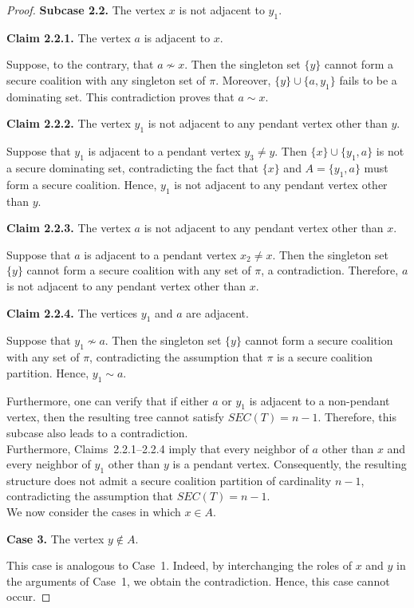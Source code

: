 \documentclass[12pt]{article}
\begin{document}
\begin{proof}
\textbf{Subcase 2.2.} The vertex $x$ is not adjacent to $y_1$.

\textbf{Claim 2.2.1.} The vertex $a$ is adjacent to $x$.

Suppose, to the contrary, that $a\not\sim x$. Then the singleton set $\{y\}$ cannot form a secure coalition with any singleton set of $\pi$. Moreover, $\{y\}\cup\{a,y_1\}$
fails to be a dominating set. This contradiction proves that $a\sim x$.

\textbf{Claim 2.2.2.} The vertex $y_1$ is not adjacent to any pendant vertex other than $y$.

Suppose that $y_1$ is adjacent to a pendant vertex $y_3\neq y$. Then $\{x\}\cup\{y_1,a\}$
is not a secure dominating set, contradicting the fact that $\{x\}$ and $A=\{y_1,a\}$ must form a secure coalition. Hence, $y_1$ is not adjacent to any pendant vertex other than $y$.

\textbf{Claim 2.2.3.} The vertex $a$ is not adjacent to any pendant vertex other than $x$.

Suppose that $a$ is adjacent to a pendant vertex $x_2\neq x$. Then the singleton set $\{y\}$ cannot form a secure coalition with any set of $\pi$, a contradiction. Therefore, $a$ is not adjacent to any pendant vertex other than $x$.

\textbf{Claim 2.2.4.} The vertices $y_1$ and $a$ are adjacent.

Suppose that $y_1\not\sim a$. Then the singleton set $\{y\}$ cannot form a secure coalition with any set of $\pi$, contradicting the assumption that $\pi$ is a secure coalition partition. Hence, $y_1\sim a$.

Furthermore, one can verify that if either $a$ or $y_1$ is adjacent to a non-pendant vertex, then the resulting tree cannot satisfy $SEC(T)=n-1$. Therefore, this subcase also leads to a contradiction.\\
Furthermore, Claims~2.2.1--2.2.4 imply that every neighbor of $a$ other than $x$ and every neighbor of $y_1$ other than $y$ is a pendant vertex. Consequently, the resulting structure does not admit a secure coalition partition of cardinality $n-1$, contradicting the assumption that $SEC(T)=n-1$.\\[2mm]
We now consider the cases in which $x\in A$.

\textbf{Case 3.} The vertex $y\notin A$.

This case is analogous to Case~1. Indeed, by interchanging the roles of $x$ and $y$ in the arguments of Case~1, we obtain the  contradiction. Hence, this case cannot occur.


\end{proof}
\end{document}
